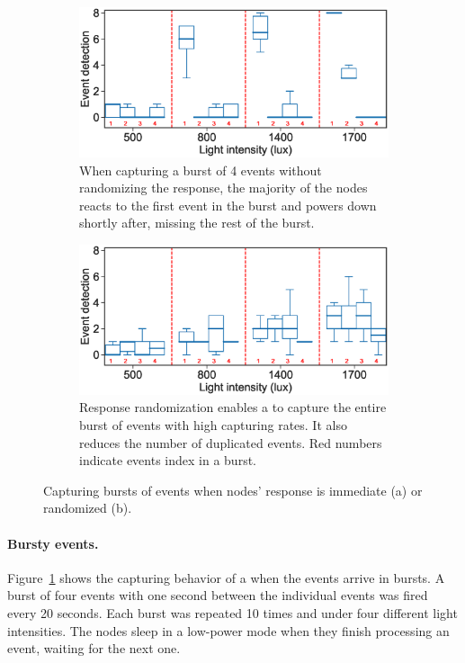 \begin{figure}
\begin{subfigure}{.49\columnwidth}
    \includegraphics[width=\columnwidth]{figures/events_burst_problem}
	\caption{When capturing a burst of 4 events without randomizing the response, the majority of the nodes reacts to the first event in the burst and powers down shortly after, missing the rest of the burst.}
    \label{fig:events_burst_problem}
\end{subfigure}\hfill
\begin{subfigure}{.49\columnwidth}
	\centering
     \includegraphics[width=\columnwidth]{figures/events_burst_rand}
    \caption{Response randomization enables a \cis to capture the entire burst of events with high capturing rates. It also reduces the number of duplicated events. Red numbers indicate events index in a burst.}
    \label{fig:events_burst_rand}
\end{subfigure}
\caption{Capturing bursts of events when \cis nodes' response is immediate (a) or randomized (b).}
\end{figure}

\paragraph{Bursty events.}
Figure~\ref{fig:events_burst_problem} shows the capturing behavior of a \cis when the events arrive in bursts. A burst of four events with one second between the individual events was fired every 20 seconds. Each burst was repeated 10 times and under four different light intensities. The nodes sleep in a low-power mode when they finish processing an event, waiting for the next one. 

